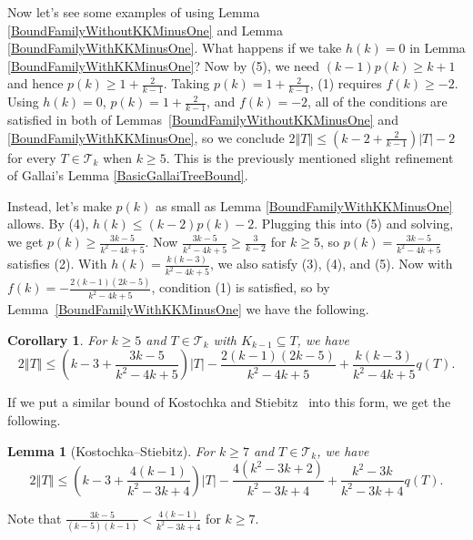 \documentclass[12pt]{article}
\theoremstyle{plain}
\newtheorem{lem}[thm]{Lemma}
\newtheorem{cor}[thm]{Corollary}
\theoremstyle{definition}
\theoremstyle{remark}
\newcommand{\fancy}[1]{\mathcal{#1}}
\newcommand{\T}{\fancy{T}}
\newcommand{\card}[1]{\left|#1\right|}
\newcommand{\size}[1]{\left\Vert#1\right\Vert}
\newcommand{\parens}[1]{\left( #1 \right)}
\begin{document}
Now let's see some examples of using Lemma \ref{BoundFamilyWithoutKKMinusOne}
and Lemma \ref{BoundFamilyWithKKMinusOne}.  What happens if we take $h(k) = 0$
in Lemma \ref{BoundFamilyWithKKMinusOne}?  Now by (5), we need $(k-1)p(k) \ge k
+ 1$ and hence $p(k) \ge 1 + \frac{2}{k-1}$.  Taking $p(k) = 1 +
\frac{2}{k-1}$, (1) requires $f(k) \ge -2$.  Using $h(k)=0$,
$p(k)=1+\frac2{k-1}$, and $f(k) = -2$, all of the conditions are satisfied in
both of Lemmas~\ref{BoundFamilyWithoutKKMinusOne} and
\ref{BoundFamilyWithKKMinusOne}, so we conclude $2\size{T} \le \parens{k-2 +
\frac{2}{k-1}}\card{T} - 2$ for every $T \in \T_k$ when $k \ge 5$.  This is the
previously mentioned slight refinement of Gallai's Lemma \ref{BasicGallaiTreeBound}.

Instead, let's make $p(k)$ as small as Lemma \ref{BoundFamilyWithKKMinusOne}
allows. By (4), $h(k) \le (k-2)p(k) - 2$. Plugging this into (5) and solving,
we get $p(k) \ge \frac{3k-5}{k^2 - 4k + 5}$.  Now $\frac{3k-5}{k^2 - 4k + 5}
\ge \frac{3}{k-2}$ for $k \ge 5$, so $p(k) = \frac{3k-5}{k^2 - 4k + 5}$
satisfies (2).  With $h(k) = \frac{k(k-3)}{k^2 - 4k + 5}$, we also satisfy (3),
(4), and (5).  Now with $f(k) = -\frac{2(k-1)(2k-5)}{k^2 - 4k + 5}$, condition
(1) is satisfied, so by Lemma~\ref{BoundFamilyWithKKMinusOne} we have the following.

\begin{cor}\label{SmallP}
	For $k \ge 5$ and $T \in \T_k$ with $K_{k-1} \subseteq T$, we have
	\[2\size{T} \le \parens{k-3 + \frac{3k-5}{k^2 - 4k + 5}}\card{T} - \frac{2(k-1)(2k-5)}{k^2 - 4k + 5} + 
	\frac{k(k-3)}{k^2 - 4k + 5}q(T).\]
\end{cor}

If we put a similar bound of Kostochka and
Stiebitz~\cite{kostochkastiebitzedgesincriticalgraph} into this form, we get
the following.
\begin{lem}[Kostochka--Stiebitz]




		For $k \ge 7$ and $T \in \T_k$, we have
		\[2\size{T} \le \parens{k-3 + \frac{4(k-1)}{k^2 - 3k + 4}}\card{T} - \frac{4(k^2-3k+2)}{k^2-3k+4} + 
		\frac{k^2 - 3k}{k^2-3k+4}q(T).\]
\end{lem}
\noindent
Note that $\frac{3k-5}{(k-5)(k-1)} < \frac{4(k-1)}{k^2 - 3k + 4}$ for $k \ge 7$.
\end{document}
